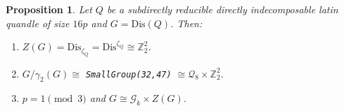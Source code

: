 \documentclass[a4paper, english, 9pt]{amsart}
\theoremstyle{plain}
\newtheorem{proposition}[theorem]{Proposition}
\theoremstyle{definition}
\def\dis{\mathrm{Dis}}
\def\comment#1{{\color{red} #1}}
\def\Z{\mathbb Z}
\begin{document}

    
    


   \begin{proposition}\label{group K}
       Let $Q$ be a subdirectly reducible directly indecomposable latin quandle of size $16p$ and $G=\dis(Q)$. Then: 
       \begin{enumerate}
                  \item[(i)] $Z(G)=\dis_{\zeta_Q}=\dis^{\zeta_Q}\cong \Z_2^2$.
           \item[(ii)]  $G/\gamma_2(G)\cong$ \texttt{SmallGroup(32,47)} $\cong \mathcal{Q}_8\times \Z_2^2$. %
           \item[(iii)] $p=1\pmod{3}$ and $G\cong \mathcal{G}_k \times Z(G)$.
              \end{enumerate}

   \end{proposition}
\end{document}
